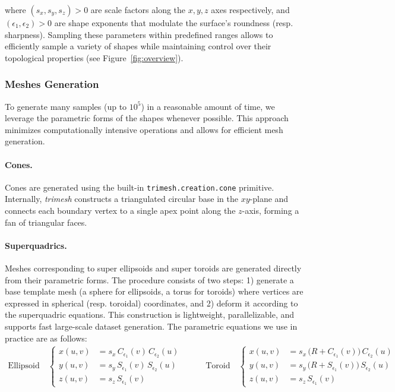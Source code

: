 where $(s_x, s_y, s_z) > 0$ are scale factors along the $x, y, z$ axes respectively, and $(\epsilon_1, \epsilon_2) > 0$ are shape exponents that modulate the surface's roundness (resp. sharpness). Sampling these parameters within predefined ranges allows to efficiently sample a variety of shapes while maintaining control over their topological properties (see Figure~\ref{fig:overview}).

\subsubsection{Meshes Generation}
\label{sssec:mesh-generation}

To generate many samples (up to $10^5$) in a reasonable amount of time, we leverage the parametric forms of the shapes whenever possible. This approach minimizes computationally intensive operations and allows for efficient mesh generation.

\paragraph{Cones.} Cones are generated using the built-in \texttt{trimesh.creation.cone} primitive. Internally, \textit{trimesh} constructs a triangulated circular base in the $xy$-plane and connects each boundary vertex to a single apex point along the $z$-axis, forming a fan of triangular faces.

\paragraph{Superquadrics.} Meshes corresponding to super ellipsoids and super toroids are generated directly from their parametric forms. The procedure consists of two steps: 1) generate a base template mesh (a sphere for ellipsoids, a torus for toroids) where vertices are expressed in spherical (resp. toroidal) coordinates, and 2) deform it according to the superquadric equations. This construction is lightweight, parallelizable, and supports fast large-scale dataset generation. The parametric equations we use in practice are as follows:
\begin{equation}
\begin{aligned}
\text{Ellipsoid} \quad
\begin{cases}
x(u,v) &= s_x \, C_{\epsilon_1}(v) \, C_{\epsilon_2}(u) \\
y(u,v) &= s_y \, S_{\epsilon_1}(v) \, S_{\epsilon_2}(u) \\
z(u,v) &= s_z \, S_{\epsilon_1}(v)
\end{cases}
\end{aligned}
\qquad
\begin{aligned}
\text{Toroid} \quad
\begin{cases}
x(u,v) &= s_x \, \bigl(R + C_{\epsilon_1}(v)\bigr) \, C_{\epsilon_2}(u) \\
y(u,v) &= s_y \, \bigl(R + S_{\epsilon_1}(v)\bigr) \, S_{\epsilon_2}(u) \\
z(u,v) &= s_z \, S_{\epsilon_1}(v)
\end{cases}
\end{aligned}
\end{equation}


